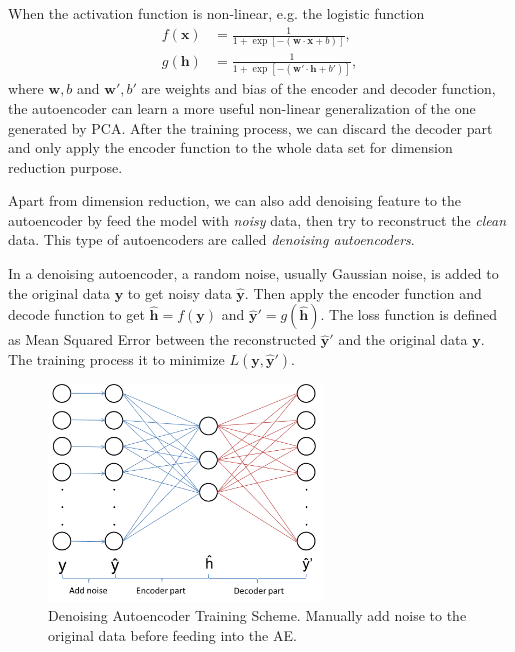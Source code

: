\documentclass[11pt,a4paper]{article}
\theoremstyle{definition}
\numberwithin{equation}{section}
\let\vec\mathbf
\begin{document}
	
	When the activation function is non-linear, e.g. the logistic function
	\begin{equation}
	\begin{split}
	f(\vec x) &= \frac{1}{1+\exp[-(\vec w\cdot\vec x + b)]},\\
	g(\vec h) &= \frac{1}{1+\exp[-(\vec w'\cdot\vec h + b')]},
	\end{split}
	\end{equation}
	where $\vec w, b$ and $\vec w', b'$ are weights and bias of the encoder and decoder function, the autoencoder can learn a more useful non-linear generalization of the one generated by PCA. 
	After the training process, we can discard the decoder part and only apply the encoder function to the whole data set for dimension reduction purpose.
	
	
	
	Apart from dimension reduction, we can also add denoising feature to the autoencoder by feed the model with \textit{noisy} data, then try to reconstruct the \textit{clean} data. This type of autoencoders are called \textit{denoising autoencoders}. 
	
	In a denoising autoencoder, a random noise, usually Gaussian noise, is added to the original data $\vec y$ to get noisy data $\hat{\vec y}$. Then apply the encoder function and decode function to get $\hat{\vec h} = f(\vec y)$  and $\vec{\hat y'} = g(\hat{\vec h})$. The loss function is defined as Mean Squared Error between the reconstructed $\vec{\hat y'}$ and the original data $\vec y$. The training process it to minimize $L(\vec y,\vec{\hat y'})$. 
	
	\begin{figure}[h!]
		\centering
		\includegraphics[width=0.65\textwidth]{dae.png}
		\caption{Denoising Autoencoder Training Scheme. Manually add noise to the original data before feeding into the AE.}
	\end{figure}
	
\end{document}
